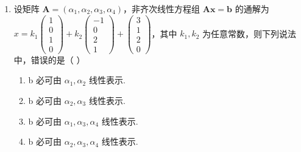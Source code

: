 \documentclass[12pt, a4paper]{ctexart}
\begin{document}
\begin{enumerate}
    ① 非齐次线性方程组 $ A^{*}x=b $ 有唯一解.
    
    ② 非齐次线性方程组 $ A^{*}x=b $ 有无穷多解.
    
    ③ 非齐次线性方程组 $ AA^{T}x=b $ 有唯一解.
    
    ④ 非齐次线性方程组 $ AA^{T}x=b $ 有无穷多解.
    \begin{enumerate}[label=(\Alph*)]
        \item 1
        \item 2
        \item 3
        \item 4
    \end{enumerate}

    \item 设矩阵 $ \mathbf{A} = (\alpha_1, \alpha_2, \alpha_3, \alpha_4) $，非齐次线性方程组 $ \mathbf{A}\mathbf{x} = \mathbf{b} $ 的通解为 $ x = k_1 \begin{pmatrix} 1 \\ 0 \\ 1 \\ 0 \end{pmatrix} + k_2 \begin{pmatrix} -1 \\ 0 \\ 2 \\ 1 \end{pmatrix} + \begin{pmatrix} 3 \\ 1 \\ 2 \\ 0 \end{pmatrix} $，其中 $ k_1, k_2 $ 为任意常数，则下列说法中，错误的是（ \underline{\hspace{1cm}} ）
    \begin{enumerate}[label=(\Alph*)]
        \item b 必可由 $ \alpha_{1},\alpha_{2} $ 线性表示.
        \item b 必可由 $ \alpha_{2},\alpha_{3} $ 线性表示.
        \item b 必可由 $ \alpha_{1},\alpha_{3},\alpha_{4} $ 线性表示.
        \item b 必可由 $ \alpha_{2},\alpha_{3},\alpha_{4} $ 线性表示.
    \end{enumerate}


\end{enumerate}
\end{document}
